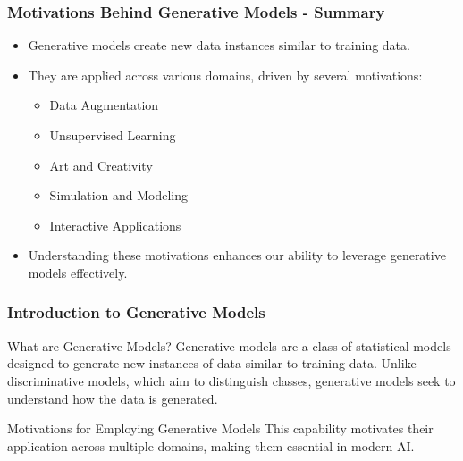 \documentclass[aspectratio=169]{beamer}
\begin{document}
\begin{frame}[fragile]
    \frametitle{Motivations Behind Generative Models - Summary}
    \begin{itemize}
        \item Generative models create new data instances similar to training data.
        \item They are applied across various domains, driven by several motivations:
        \begin{itemize}
            \item Data Augmentation
            \item Unsupervised Learning
            \item Art and Creativity
            \item Simulation and Modeling
            \item Interactive Applications
        \end{itemize}
        \item Understanding these motivations enhances our ability to leverage generative models effectively.
    \end{itemize}
\end{frame}

\begin{frame}[fragile]
    \frametitle{Introduction to Generative Models}
    \begin{block}{What are Generative Models?}
        Generative models are a class of statistical models designed to generate new instances of data similar to training data. Unlike discriminative models, which aim to distinguish classes, generative models seek to understand how the data is generated.
    \end{block}
    \begin{block}{Motivations for Employing Generative Models}
        This capability motivates their application across multiple domains, making them essential in modern AI.
    \end{block}
\end{frame}
\end{document}
